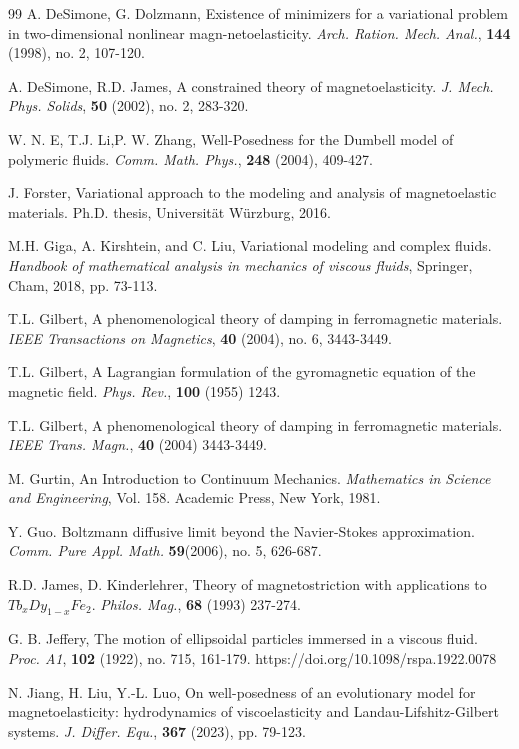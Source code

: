 \documentclass[reqno,11pt]{amsart}
\numberwithin{equation}{section}
\begin{document}
\begin{thebibliography}{99}
 A. DeSimone, G. Dolzmann, Existence of minimizers for a variational problem in two-dimensional nonlinear magn-netoelasticity. {\em Arch. Ration. Mech. Anal.}, \textbf{144} (1998), no. 2, 107-120.

 A. DeSimone, R.D. James, A constrained theory of magnetoelasticity. {\em J. Mech. Phys. Solids}, \textbf{50}  (2002), no. 2, 283-320.

 W. N. E, T.J. Li,P. W. Zhang, Well-Posedness for the Dumbell model of polymeric fluids. \textit{Comm. Math. Phys.}, \textbf{248} (2004), 409-427. 

	J. Forster, Variational approach to the modeling and analysis of magnetoelastic materials. Ph.D.
	thesis, Universität Würzburg, 2016.

  M.H. Giga, A. Kirshtein, and C. Liu, Variational modeling and complex fluids. {\em Handbook of mathematical analysis in mechanics of viscous fluids}, Springer, Cham, 2018, pp. 73-113.

		T.L. Gilbert, A phenomenological theory of damping in ferromagnetic materials. {\em IEEE Transactions
	on Magnetics}, {\bf 40} (2004), no. 6, 3443-3449.

 T.L. Gilbert, A Lagrangian formulation of the gyromagnetic equation of the magnetic field. {\em Phys. Rev.}, {\bf 100} (1955) 1243.

 T.L. Gilbert, A phenomenological theory of damping in ferromagnetic materials. {\em IEEE Trans. Magn.}, \textbf{40} (2004) 3443-3449.

 M. Gurtin, An Introduction to Continuum Mechanics. \textit{Mathematics in Science and Engineering}, Vol. 158. Academic Press, New York, 1981.
    
 Y. Guo. Boltzmann diffusive limit beyond the Navier-Stokes approximation. {\em Comm. Pure Appl. Math.} {\bf 59}(2006), no. 5, 626-687.

 R.D. James, D. Kinderlehrer, Theory of magnetostriction with applications to $ Tb_{x}Dy_{1-x}Fe_{2} $. {\em Philos. Mag.}, \textbf{68} (1993) 237-274.

G. B. Jeffery, The motion of ellipsoidal particles immersed in a viscous fluid. {\em Proc. A1}, {\bf 102} (1922), no. 715, 161-179. https://doi.org/10.1098/rspa.1922.0078

 N. Jiang, H. Liu, Y.-L. Luo,  On well-posedness of an evolutionary model for magnetoelasticity: hydrodynamics of viscoelasticity and Landau-Lifshitz-Gilbert systems. \emph{J. Differ. Equ.},  {\bf 367} (2023), pp. 79-123.


\end{thebibliography}
\end{document}
